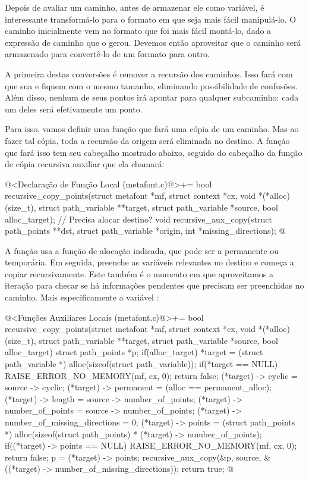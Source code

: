 Depois de avaliar um caminho, antes de armazenar ele como variável, é
interessante transformá-lo para o formato em que seja mais fácil
manipulá-lo. O caminho inicialmente vem no formato que foi mais fácil
montá-lo, dado a expressão de caminho que o gerou. Devemos então
aproveitar que o caminho será armazenado para convertê-lo de um
formato para outro.

A primeira destas conversões é remover a recursão dos caminhos. Isso
fará com que sua  e 
fiquem com o mesmo tamanho, eliminando possibilidade de
confusões. Além disso, nenhum de seus pontos irá apontar para qualquer
subcaminho: cada um deles será efetivamente um ponto.

Para isso, vamos definir uma função que fará uma cópia de um
caminho. Mas ao fazer tal cópia, toda a recursão da origem será
eliminada no destino. A função que fará isso tem seu cabeçalho
mostrado abaixo, seguido do cabeçalho da função de cópia recursiva
auxiliar que ela chamará:

\iniciocodigo
@<Declaração de Função Local (metafont.c)@>+=
bool recursive_copy_points(struct metafont *mf, struct context *cx,
                           void *(*alloc)(size_t),
                           struct path_variable **target,
                           struct path_variable *source,
                           bool alloc_target); // Precisa alocar destino?
void recursive_aux_copy(struct path_points **dst,
                        struct path_variable *origin, int *missing_directions);
@
\fimcodigo

A função usa a função de alocação indicada, que pode ser a permanente
ou temporária. Em seguida, preenche as variáveis relevantes no destino
e começa a copiar recursivamente. Este também é o momento em que
aproveitamos a iteração para checar se há informações pendentes que
precisam ser preenchidas no caminho. Mais especificamente a
variável :

\iniciocodigo
@<Funções Auxiliares Locais (metafont.c)@>+=
bool recursive_copy_points(struct metafont *mf, struct context *cx,
                          void *(*alloc)(size_t),
                          struct path_variable **target,
                          struct path_variable *source,
                          bool alloc_target){
  struct path_points *p;
  if(alloc_target){
    *target = (struct path_variable *) alloc(sizeof(struct path_variable));
    if(*target == NULL){
      RAISE_ERROR_NO_MEMORY(mf, cx, 0);
      return false;
    }
  }
  (*target) -> cyclic = source -> cyclic;
  (*target) -> permanent = (alloc == permanent_alloc);
  (*target) -> length = source -> number_of_points;
  (*target) -> number_of_points = source -> number_of_points;
  (*target) -> number_of_missing_directions = 0;
  (*target) -> points = (struct path_points *)
                          alloc(sizeof(struct path_points) *
                                (*target) -> number_of_points);
  if((*target) -> points == NULL){
    RAISE_ERROR_NO_MEMORY(mf, cx, 0);
    return false;
  }
  p = (*target) -> points;
  recursive_aux_copy(&p, source, &((*target) -> number_of_missing_directions));
  return true;
}
@
\fimcodigo

